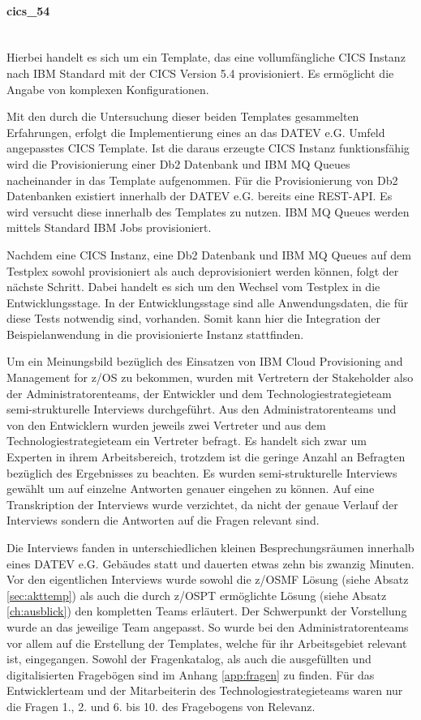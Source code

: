 \paragraph{\glqq cics\_54\grqq}~\\
Hierbei handelt es sich um ein Template, das eine vollumfängliche CICS Instanz nach IBM Standard mit der CICS Version 5.4 provisioniert.
Es ermöglicht die Angabe von komplexen Konfigurationen.

Mit den durch die Untersuchung dieser beiden Templates gesammelten Erfahrungen, erfolgt die Implementierung eines an das DATEV e.G. Umfeld angepasstes CICS Template.
Ist die daraus erzeugte CICS Instanz funktionsfähig wird die Provisionierung einer Db2 Datenbank und IBM MQ Queues nacheinander in das Template aufgenommen.
Für die Provisionierung von Db2 Datenbanken existiert innerhalb der DATEV e.G. bereits eine REST-API.
Es wird versucht diese innerhalb des Templates zu nutzen.
IBM MQ Queues werden mittels Standard IBM Jobs provisioniert.

Nachdem eine CICS Instanz, eine Db2 Datenbank und IBM MQ Queues auf dem Testplex sowohl provisioniert als auch deprovisioniert werden können, folgt der nächste Schritt.
Dabei handelt es sich um den Wechsel vom Testplex in die Entwicklungsstage.
In der Entwicklungsstage sind alle Anwendungsdaten, die für diese Tests notwendig sind, vorhanden.
Somit kann hier die Integration der Beispielanwendung in die provisionierte Instanz stattfinden.

Um ein Meinungsbild bezüglich des Einsatzen von \glqq IBM Cloud Provisioning and Management for z/OS\grqq{} zu bekommen, wurden mit Vertretern der Stakeholder also der Administratorenteams, der Entwickler und dem Technologiestrategieteam semi-strukturelle Interviews durchgeführt.
Aus den Administratorenteams und von den Entwicklern wurden jeweils zwei Vertreter und aus dem Technologiestrategieteam ein Vertreter befragt.
Es handelt sich zwar um Experten in ihrem Arbeitsbereich, trotzdem ist die geringe Anzahl an Befragten bezüglich des Ergebnisses zu beachten.
Es wurden semi-strukturelle Interviews gewählt um auf einzelne Antworten genauer eingehen zu können.
Auf eine Transkription der Interviews wurde verzichtet, da nicht der genaue Verlauf der Interviews sondern die Antworten auf die Fragen relevant sind.

Die Interviews fanden in unterschiedlichen kleinen Besprechungsräumen innerhalb eines DATEV e.G. Gebäudes statt und dauerten etwas zehn bis zwanzig Minuten.
Vor den eigentlichen Interviews wurde sowohl die z/OSMF Lösung (siehe Absatz \ref{sec:akttemp}) als auch die durch z/OSPT ermöglichte Lösung (siehe Absatz \ref{ch:ausblick}) den kompletten Teams erläutert.
Der Schwerpunkt der Vorstellung wurde an das jeweilige Team angepasst.
So wurde bei den Administratorenteams vor allem auf die Erstellung der Templates, welche für ihr Arbeitsgebiet relevant ist, eingegangen.
Sowohl der Fragenkatalog, als auch die ausgefüllten und digitalisierten Fragebögen sind im Anhang \ref{app:fragen} zu finden.
Für das Entwicklerteam und der Mitarbeiterin des Technologiestrategieteams waren nur die Fragen 1., 2. und 6. bis 10. des Fragebogens von Relevanz.
